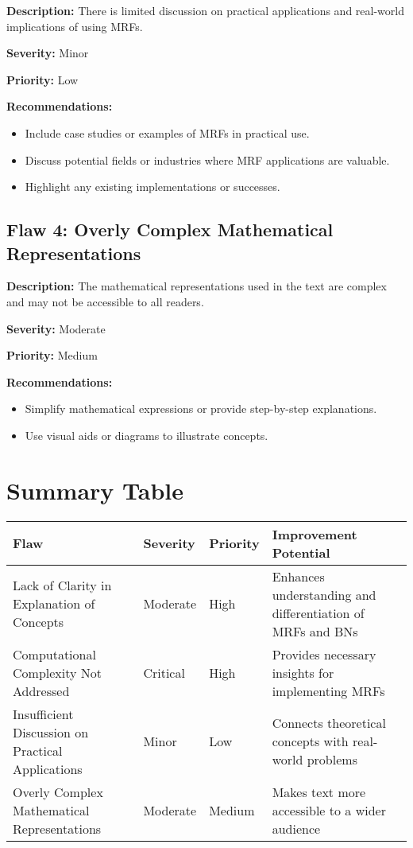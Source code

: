 \documentclass{article}
\begin{document}
\textbf{Description:} There is limited discussion on practical applications and real-world implications of using MRFs.

\textbf{Severity:} Minor

\textbf{Priority:} Low

\textbf{Recommendations:} 
\begin{itemize}
    \item Include case studies or examples of MRFs in practical use.
    \item Discuss potential fields or industries where MRF applications are valuable.
    \item Highlight any existing implementations or successes.
\end{itemize}

\subsection*{Flaw 4: Overly Complex Mathematical Representations}

\textbf{Description:} The mathematical representations used in the text are complex and may not be accessible to all readers.

\textbf{Severity:} Moderate

\textbf{Priority:} Medium

\textbf{Recommendations:}
\begin{itemize}
    \item Simplify mathematical expressions or provide step-by-step explanations.
    \item Use visual aids or diagrams to illustrate concepts.
\end{itemize}


\newpage
\section*{Summary Table}

\begin{center}
\begin{tabular}{|m{4cm}|m{2cm}|m{2cm}|m{4cm}|}
\hline
\textbf{Flaw} & \textbf{Severity} & \textbf{Priority} & \textbf{Improvement Potential} \\ \hline
Lack of Clarity in Explanation of Concepts & Moderate & High & Enhances understanding and differentiation of MRFs and BNs \\ \hline
Computational Complexity Not Addressed & Critical & High & Provides necessary insights for implementing MRFs \\ \hline
Insufficient Discussion on Practical Applications & Minor & Low & Connects theoretical concepts with real-world problems \\ \hline
Overly Complex Mathematical Representations & Moderate & Medium & Makes text more accessible to a wider audience \\ \hline
\end{tabular}
\end{center}
\end{document}
